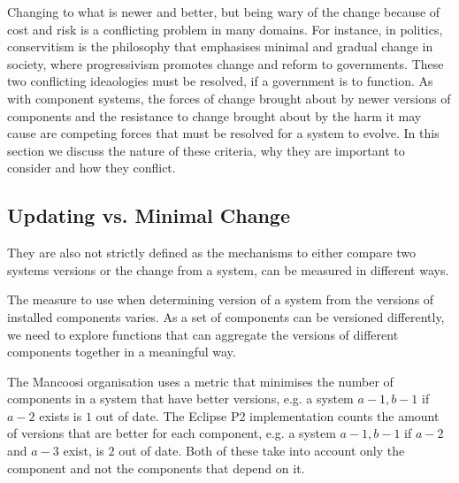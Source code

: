 Changing to what is newer and better, but being wary of the change because of cost and risk is a conflicting problem in many domains.
For instance, in politics, conservitism is the philosophy that emphasises minimal and gradual change in society, %
where progressivism promotes change and reform to governments.
These two conflicting ideaologies must be resolved, if a government is to function. 
As with component systems, 
the forces of change brought about by newer versions of components and the resistance to change brought about by the harm it may cause
are competing forces that must be resolved for a system to evolve.
In this section we discuss the nature of these criteria, why they are important to consider and how they conflict.


\subsection{Updating vs. Minimal Change}





They are also not strictly defined as the mechanisms to either compare two systems versions or the change from a system,
can be measured in different ways.

The measure to use when determining version of a system from the versions of installed components varies.
As a set of components can be versioned differently, 
we need to explore functions that can aggregate the versions of different components together in a meaningful way.

The Mancoosi organisation uses a metric that minimises the number of components in a system that have better versions, 
e.g. a system $a-1,b-1$ if $a-2$ exists is $1$ out of date. 
The Eclipse P2 implementation counts the amount of versions that are better for each component,
e.g. a system $a-1,b-1$ if $a-2$ and $a-3$ exist, is $2$ out of date.
Both of these take into account only the component and not the components that depend on it.


